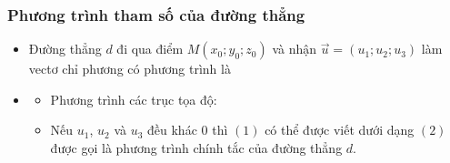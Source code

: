 \subsubsection{Phương trình tham số của đường thẳng}
\begin{itemize}
	\item [\iconMT]  Đường thẳng $d$ đi qua điểm $M(x_0;y_0;z_0)$ và nhận $\vec{u}=(u_1;u_2;u_3)$ làm vectơ chỉ phương có phương trình là 
	\item [\iconMT] 
	\begin{boxdn}
		\begin{itemize}
			\item [\ding{172}] Phương trình các trục tọa độ: 
			\item [\ding{173}] Nếu $u_1$, $u_2$ và $u_3$ đều khác $0$ thì $(1)$ có thể được viết dưới dạng
			$(2)$ được gọi là phương trình chính tắc của đường thẳng $d$.
		\end{itemize}
	\end{boxdn}
\end{itemize}
